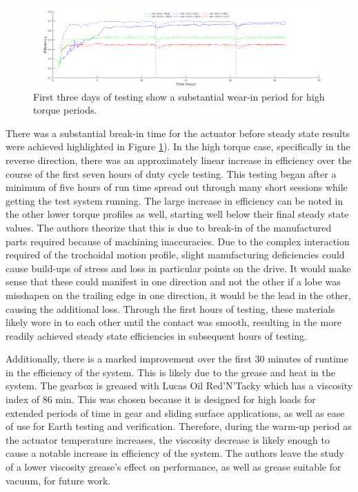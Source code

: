 \begin{figure}[t]
   \centering
   \includegraphics[width=\linewidth]{fig/burn_in}
   \caption{First three days of testing show a substantial wear-in period for high torque periods.}
   \label{fig:break_in}
\end{figure}

There was a substantial break-in time for the actuator before steady state results were achieved highlighted in Figure \ref{fig:break_in}).
In the high torque case, specifically in the reverse direction, there was an approximately linear increase in efficiency over the course of the first seven hours of duty cycle testing.
This testing began after a minimum of five hours of run time spread out through many short sessions while getting the test system running.
The large increase in efficiency can be noted in the other lower torque profiles as well, starting well below their final steady state values.
The authors theorize that this is due to break-in of the manufactured parts required because of machining inaccuracies.
Due to the complex interaction required of the trochoidal motion profile, slight manufacturing deficiencies could cause build-ups of stress and loss in particular points on the drive.
It would make sense that these could manifest in one direction and not the other if a lobe was misshapen on the trailing edge in one direction, it would be the lead in the other, causing the additional loss.
Through the first hours of testing, these materials likely wore in to each other until the contact was smooth, resulting in the more readily achieved steady state efficiencies in subsequent hours of testing.

Additionally, there is a marked improvement over the first 30 minutes of runtime in the efficiency of the system.
This is likely due to the grease and heat in the system.
The gearbox is greased with Lucas Oil Red'N'Tacky which has a viscosity index of 86 min.
This was chosen because it is designed for high loads for extended periods of time in gear and sliding surface applications, as well as ease of use for Earth testing and verification.
Therefore, during the warm-up period as the actuator temperature increases, the viscosity decrease is likely enough to cause a notable increase in efficiency of the system.
The authors leave the study of a lower viscosity grease's effect on performance, as well as grease suitable for vacuum, for future work.


